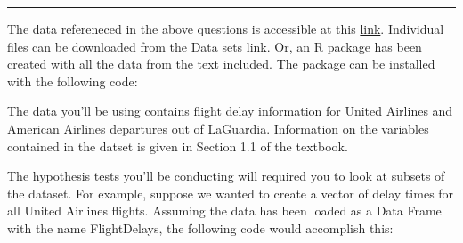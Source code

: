 \documentclass[]{article}
\begin{document}
\begin{center}\rule{0.5\linewidth}{\linethickness}\end{center}

The data refereneced in the above questions is accessible at this
\href{https://sites.google.com/site/ChiharaHesterberg}{link}. Individual
files can be downloaded from the
\href{https://sites.google.com/site/chiharahesterberg/data2}{Data sets}
link. Or, an R package has been created with all the data from the text
included. The package can be installed with the following code:

The data you'll be using contains flight delay information for United
Airlines and American Airlines departures out of LaGuardia. Information
on the variables contained in the datset is given in Section 1.1 of the
textbook.

The hypothesis tests you'll be conducting will required you to look at
subsets of the dataset. For example, suppose we wanted to create a
vector of delay times for all United Airlines flights. Assuming the data
has been loaded as a Data Frame with the name FlightDelays, the
following code would accomplish this:
\end{document}
